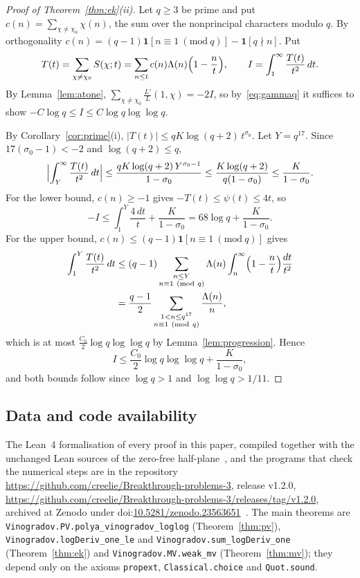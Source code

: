 \documentclass{aomart}
\numberwithin{equation}{section}
\newcommand{\releaseURL}{https://github.com/creelie/Breakthrough-problems-3/releases/tag/v1.2.0}
\newcommand{\repoURL}{https://github.com/creelie/Breakthrough-problems-3}
\theoremstyle{definition}
\begin{document}
\begin{proof}[Proof of Theorem~\ref{thm:ek}(ii)]
Let $q\ge3$ be prime and put $c(n)=\sum_{\chi\ne\chi_0}\chi(n)$, the sum over the nonprincipal
characters modulo $q$. By orthogonality $c(n)=(q-1)\mathbf 1[n\equiv1\ (\mathrm{mod}\ q)]
-\mathbf 1[q\nmid n]$. Put
\[
  T(t)=\sum_{\chi\ne\chi_0}S(\chi;t)=\sum_{n\le t}c(n)\Lambda(n)\Bigl(1-\frac nt\Bigr),\qquad
  I=\int_1^\infty\frac{T(t)}{t^2}\,dt.
\]
By Lemma~\ref{lem:atone}, $\sum_{\chi\ne\chi_0}\frac{L'}{L}(1,\chi)=-2I$, so by~\eqref{eq:gammaq}
it suffices to show $-C\log q\le I\le C\log q\log\log q$.

By Corollary~\ref{cor:prime}(i), $|T(t)|\le qK\log(q+2)\,t^{\sigma_0}$. Let $Y=q^{17}$. Since
$17(\sigma_0-1)<-2$ and $\log(q+2)\le q$,
\[
  \Bigl|\int_Y^\infty\frac{T(t)}{t^2}\,dt\Bigr|\le\frac{qK\log(q+2)\,Y^{\sigma_0-1}}{1-\sigma_0}
  \le\frac{K\log(q+2)}{q(1-\sigma_0)}\le\frac K{1-\sigma_0}.
\]
For the lower bound, $c(n)\ge-1$ gives $-T(t)\le\psi(t)\le4t$, so
\[
  -I\le\int_1^Y\frac{4\,dt}t+\frac K{1-\sigma_0}=68\log q+\frac K{1-\sigma_0}.
\]
For the upper bound, $c(n)\le(q-1)\mathbf 1[n\equiv1\ (\mathrm{mod}\ q)]$ gives
\begin{align*}
  \int_1^Y\frac{T(t)}{t^2}\,dt&\le(q-1)\sum_{\substack{n\le Y\\n\equiv1\ (\mathrm{mod}\ q)}}
  \Lambda(n)\int_n^\infty\Bigl(1-\frac nt\Bigr)\frac{dt}{t^2}\\
  &=\frac{q-1}2\sum_{\substack{1<n\le q^{17}\\n\equiv1\ (\mathrm{mod}\ q)}}\frac{\Lambda(n)}n,
\end{align*}
which is at most $\frac{C_0}2\log q\log\log q$ by Lemma~\ref{lem:progression}. Hence
\[
  I\le\frac{C_0}2\log q\log\log q+\frac K{1-\sigma_0},
\]
and both bounds follow since $\log q>1$ and $\log\log q>1/11$.
\end{proof}

\subsection*{Data and code availability}
{\raggedright The Lean~4 formalisation of every proof in this paper, compiled together with the unchanged Lean
sources of the zero-free half-plane~\cite{OAI26}, and the programs that check the numerical
steps are in the repository \url{\repoURL}, release v1.2.0, \url{\releaseURL}, archived at Zenodo under doi:\href{https://doi.org/10.5281/zenodo.23563651}{10.5281/zenodo.23563651}~\cite{BB26code}.
The main theorems are \texttt{Vinogradov.PV.polya\_vinogradov\_loglog} (Theorem~\ref{thm:pv}),
\texttt{Vinogradov.logDeriv\_one\_le} and \texttt{Vinogradov.sum\_logDeriv\_one}
(Theorem~\ref{thm:ek}) and \texttt{Vinogradov.MV.weak\_mv} (Theorem~\ref{thm:mv}); they depend only
on the axioms \texttt{propext}, \texttt{Classical.choice} and \texttt{Quot.sound}.\par}
\end{document}
